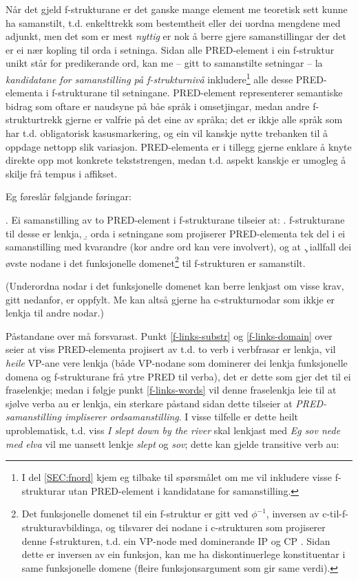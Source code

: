\documentclass[11pt,a4paper,oneside,draft]{book}
\begin{document}
Når det gjeld f-strukturane er det ganske mange element me teoretisk
sett kunne ha samanstilt, t.d. enkelttrekk som bestemtheit eller dei
uordna mengdene med adjunkt, men det som er mest \emph{nyttig} er nok å
berre gjere samanstillingar der det er ei nær kopling til orda i
setninga. Sidan alle PRED-element i ein f-struktur unikt står for
predikerande ord, kan me -- gitt to samanstilte setningar -- la
\emph{kandidatane for samanstilling på f-strukturnivå} inkludere\footnote{I del \ref{SEC:fnord} kjem eg tilbake til spørsmålet om me vil
        inkludere visse f-strukturar utan PRED-element i kandidatane
        for samanstilling. }
alle desse PRED-elementa i f-strukturane til setningane. PRED-element
representerer semantiske bidrag som oftare er naudsyne på båe språk i
omsetjingar, medan andre f-strukturtrekk gjerne er valfrie på det eine
av språka; det er ikkje alle språk som har t.d. obligatorisk
kasusmarkering, og ein vil kanskje nytte trebanken til å oppdage
nettopp slik variasjon.  PRED-elementa er i tillegg gjerne enklare å
knyte direkte opp mot konkrete tekststrengen, medan t.d. aspekt
kanskje er umogleg å skilje frå tempus i affikset.

Eg føreslår følgjande føringar:

\ex. \label{f-links} Ei samanstilling av to PRED-element i f-strukturane tilseier at:
\a. \label{f-links-substr} f-strukturane til desse er lenkja,
\b. \label{f-links-words} orda i setningane som projiserer
   PRED-elementa tek del i ei samanstilling med kvarandre (kor andre
   ord kan vere involvert), og at
\c. \label{f-links-domain} iallfall dei øvste nodane i det funksjonelle
   domenet\footnote{Det funksjonelle domenet til ein f-struktur er gitt ved
 $\phi^{-1}$, inversen av c-til-f-strukturavbildinga, og tilsvarer dei
 nodane i c-strukturen som projiserer denne f-strukturen, t.d. ein
 VP-node med dominerande IP og CP
 \citep[s.~126]{bresnan2001lfs}. Sidan dette er inversen av ein
 funksjon, kan me ha diskontinuerlege konstituentar i same
 funksjonelle domene (fleire funksjonsargument som gir same verdi). } til f-strukturen er samanstilt.

(Underordna nodar i det funksjonelle domenet kan berre lenkjast om
visse krav, gitt nedanfor, er oppfylt. Me kan altså gjerne ha
c-strukturnodar som ikkje er lenkja til andre nodar.)


Påstandane over må forsvarast. Punkt \ref{f-links-substr} og
\ref{f-links-domain} over seier at viss PRED-elementa projisert av
t.d. to verb i verbfrasar er lenkja, vil \emph{heile} VP-ane vere lenkja
(både VP-nodane som dominerer dei lenkja funksjonelle domena og
f-strukturane frå ytre PRED til verba), det er dette som gjer det til
ei fraselenkje; medan i følgje punkt \ref{f-links-words} vil denne
fraselenkja leie til at sjølve verba au er lenkja, ein sterkare
påstand sidan dette tilseier at \emph{PRED-samanstilling impliserer ordsamanstilling}. I visse tilfelle er dette heilt uproblematisk,
t.d. viss \emph{I slept down by the river} skal lenkjast med \emph{Eg sov nede med elva} vil me uansett lenkje \emph{slept} og \emph{sov}; dette kan gjelde
transitive verb au:
\end{document}
